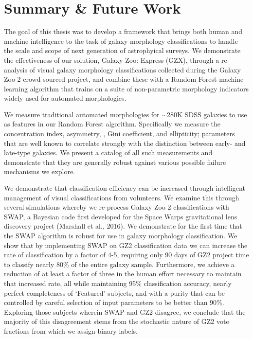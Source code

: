 \chapter{Summary \& Future Work}
\label{chap:summary}

The goal of this thesis was to develop a framework that brings both human and machine intelligence to the task of galaxy morphology classifications to handle the scale and scope of next generation of astrophyical surveys. We demonstrate the effectiveness of our solution, Galaxy Zoo: Express (GZX), through a re-analysis of visual galaxy morphology classifications collected during the Galaxy Zoo 2 crowd-sourced project, and combine these with a Random Forest machine learning algorithm that trains on a suite of non-parametric morphology indicators widely used for automated morphologies. 

We measure traditional automated morphologies for $\sim$280K SDSS galaxies to use as features in our Random Forest algorithm. Specifically we measure the concentration index, asymmetry, , Gini coefficient, and ellipticity; parameters that are well known to correlate strongly with the distinction between early- and late-type galaxies. We present a catalog of all such measurements and demonstrate that they are generally robust against various possible failure mechanisms we explore.


We demonstrate that classification efficiency can be increased through intelligent management of visual classifications from volunteers. We examine this through several simulations whereby we re-process Galaxy Zoo 2 classifications with SWAP, a Bayesian code first developed for the Space Warps gravitational lens discovery project (Marshall et al., 2016). We demonstrate for the first time that the SWAP algorithm is robust for use in galaxy morphology classification. We show that by implementing SWAP on GZ2 classification data we can increase the rate of classification by a factor of 4-5, requiring only 90 days of GZ2 project time to classify nearly 80\% of the entire galaxy sample. Furthermore, we achieve a reduction of at least a factor of three in the human effort necessary to maintain that increased rate, all while maintaining 95\% classification accuracy, nearly perfect completeness of ‘Featured’ subjects, and with a purity that can be controlled by careful selection of input parameters to be better than 90\%. Exploring those subjects wherein SWAP and GZ2 disagree, we conclude that the majority of this disagreement stems from the stochastic nature of GZ2 vote fractions from which we assign binary labels. 


